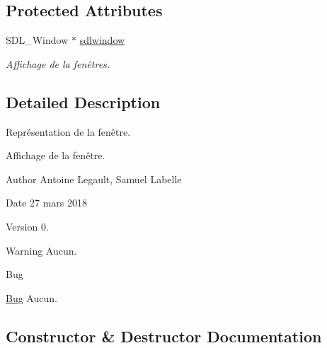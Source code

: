 \subsection*{Protected Attributes}
\begin{DoxyCompactItemize}
\item 
\hypertarget{class_window_a2fbd44b18a6d7d817eeb8d7d75733ba7}{}S\+D\+L\+\_\+\+Window $\ast$ \hyperlink{class_window_a2fbd44b18a6d7d817eeb8d7d75733ba7}{sdlwindow}\label{class_window_a2fbd44b18a6d7d817eeb8d7d75733ba7}

\begin{DoxyCompactList}\small\item\em Affichage de la fenêtres. \end{DoxyCompactList}\end{DoxyCompactItemize}


\subsection{Detailed Description}
Représentation de la fenêtre. 

Affichage de la fenêtre. \begin{DoxyAuthor}{Author}
Antoine Legault, Samuel Labelle 
\end{DoxyAuthor}
\begin{DoxyDate}{Date}
27 mars 2018 
\end{DoxyDate}
\begin{DoxyVersion}{Version}
0. 
\end{DoxyVersion}
\begin{DoxyWarning}{Warning}
Aucun. 
\end{DoxyWarning}
\begin{DoxyRefDesc}{Bug}
\item[\hyperlink{bug__bug000022}{Bug}]Aucun. \end{DoxyRefDesc}


\subsection{Constructor \& Destructor Documentation}
\hypertarget{class_window_a96efd3d806565db46c9328c64347a48e}{}
